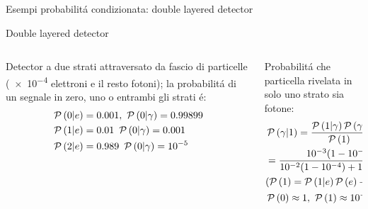 \documentclass[asd-beamer.tex]{subfiles}
\begin{document}
\begin{frame}[allowframebreaks]{Esempi probabilit\'a condizionata: double layered detector}
\begin{block}{Double layered detector}
	\begin{columns}[T]
		\begin{column}{0.5\textwidth}
			Detector a due strati attraversato da fascio di particelle (\num{e-4} elettroni e il resto fotoni); la probabilit\'a di un segnale in zero, uno o entrambi gli strati \'e:
			\begin{align*}
			&\operatorname{\mathcal{P}}{(0|e)}=0.001,\ \operatorname{\mathcal{P}}{(0|\gamma)}=0.99899\\
			&\operatorname{\mathcal{P}}{(1|e)}=0.01\ \operatorname{\mathcal{P}}{(0|\gamma)}=0.001\\
			&\operatorname{\mathcal{P}}{(2|e)}=0.989\ \operatorname{\mathcal{P}}{(0|\gamma)}=\num{e-5}\\
			\end{align*}
		\end{column}
		\begin{column}{0.5\textwidth}
			Probabilit\'a che particella rivelata in solo uno strato sia fotone:
			\begin{align*}
			&\prob{(\gamma|1)}=\frac{\prob{(1|\gamma)}\prob{(\gamma)}}{\prob{(1)}}\\
			&=\frac{\num{e-3}(1-\num{e-4})}{\num{e-2}(1-\num{e-4})+\num{e-2}\num{e-4}}\\
			&(\prob{(1)}=\prob{(1|e)}\prob{(e)}+\prob{(1|\gamma)}\prob{(\gamma)})\\
			&\prob{(0)}\approx 1,\ \prob{(1)}\approx\num{e-3},\ \prob{(2)}\approx\num{e-4}
			\end{align*}
		\end{column}
	\end{columns}
\end{block}
\end{frame}
\end{document}
